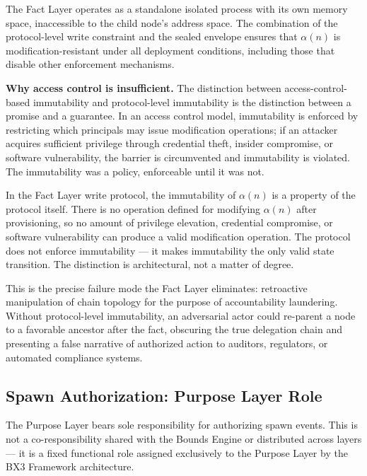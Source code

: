 The Fact Layer operates as a standalone isolated process with its own memory space, inaccessible to the child node's address space. The combination of the protocol-level write constraint and the sealed envelope ensures that $\alpha(n)$ is modification-resistant under all deployment conditions, including those that disable other enforcement mechanisms.

\medskip
\noindent\textbf{Why access control is insufficient.} The distinction between access-control-based immutability and protocol-level immutability is the distinction between a promise and a guarantee. In an access control model, immutability is enforced by restricting which principals may issue modification operations; if an attacker acquires sufficient privilege through credential theft, insider compromise, or software vulnerability, the barrier is circumvented and immutability is violated. The immutability was a policy, enforceable until it was not.

In the Fact Layer write protocol, the immutability of $\alpha(n)$ is a property of the protocol itself. There is no operation defined for modifying $\alpha(n)$ after provisioning, so no amount of privilege elevation, credential compromise, or software vulnerability can produce a valid modification operation. The protocol does not enforce immutability — it makes immutability the only valid state transition. The distinction is architectural, not a matter of degree.

This is the precise failure mode the Fact Layer eliminates: retroactive manipulation of chain topology for the purpose of accountability laundering. Without protocol-level immutability, an adversarial actor could re-parent a node to a favorable ancestor after the fact, obscuring the true delegation chain and presenting a false narrative of authorized action to auditors, regulators, or automated compliance systems.

\subsection{Spawn Authorization: Purpose Layer Role}
\label{sec:purpose-layer-authorization}

The Purpose Layer bears sole responsibility for authorizing spawn events. This is not a co-responsibility shared with the Bounds Engine or distributed across layers — it is a fixed functional role assigned exclusively to the Purpose Layer by the BX3 Framework architecture.

